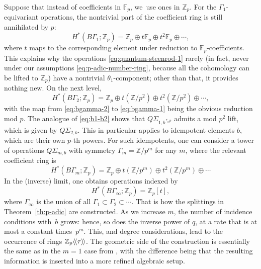 \documentclass[JEP,XML,SOM,Unicode,NoFloatCountersInSection,published]{cedram}
\theoremstyle{plain}
\theoremstyle{definition}
\newcommand{\bF}{{\mathbb F}}
\newcommand{\bZ}{{\mathbb Z}}
\newcommand{\lla}{\langle\hspace{-0.3ex}\langle}
\newcommand{\rra}{\rangle\hspace{-0.3ex}\rangle}
\begin{document}
Suppose that instead of coefficients in $\bF_p$, we~use ones in $\bZ_p$. For the $\Gamma_1$-equivariant operations, the nontrivial part of the coefficient ring is still annihilated by $p$:
\begin{equation} \label{eq:bgamma-1}
H^*(B\Gamma_1;\bZ_p) = \bZ_p \oplus t\bF_p \oplus t^2\bF_p \oplus \cdots,
\end{equation}
where $t$ maps to the corresponding element under reduction to $\bF_p$-coefficients. This explains why the operations \eqref{eq:quantum-steenrod-1} rarely (in fact, never under our assumptions \eqref{eq:p-adic-number-ring}, because all the cohomology can be lifted to $\bZ_p$) have a nontrivial $\theta_1$-component; other than that, it provides nothing new. On the next level,
\begin{equation} \label{eq:bgamma-2}
H^*(B\Gamma_2;\bZ_p) = \bZ_p \oplus t(\bZ/p^2) \oplus t^2(\bZ/p^2) \oplus \cdots,
\end{equation}
with the map from \eqref{eq:bgamma-2} to \eqref{eq:bgamma-1} being the obvious reduction mod $p$. The analogue of \eqref{eq:b1-b2} shows that $Q\Sigma_{1,b^{\ast_q p}}$ admits a mod $p^2$ lift, which is given by $Q\Sigma_{2,b}$. This in particular applies to idempotent elements $b$, which are their own $p$-th powers. For such idempotents, one can consider a tower of operations $Q\Sigma_{m,b}$ with symmetry $\Gamma_m = \bZ/p^m$ for any $m$, where the relevant coefficient ring is
\begin{equation} \label{eq:bgamma-3}
H^*(B\Gamma_m;\bZ_p) = \bZ_p \oplus t(\bZ/p^m) \oplus t^2(\bZ/p^m) \oplus \cdots
\end{equation}
In the (inverse) limit, one obtains operations indexed by
\begin{equation*}
H^*(B\Gamma_\infty;\bZ_p) = \bZ_p[t],
\end{equation*}
where $\Gamma_\infty$ is the union of all $\Gamma_1 \subset \Gamma_2 \subset \cdots$. That is how the splittings in Theorem~\ref{th:p-adic} are constructed. As we increase $m$, the number of incidence conditions with~$b$ grows: hence, so does the inverse power of $q$, at a rate that is at most a constant times~$p^m$. This, and degree considerations, lead to the occurrence of rings $\bZ_p\lla \tau \rra$. The geometric side of the construction is essentially the same as in the $m = 1$ case from \cite{seidel-wilkins21}, with the difference being that the resulting information is inserted into a more refined algebraic setup.
\end{document}
